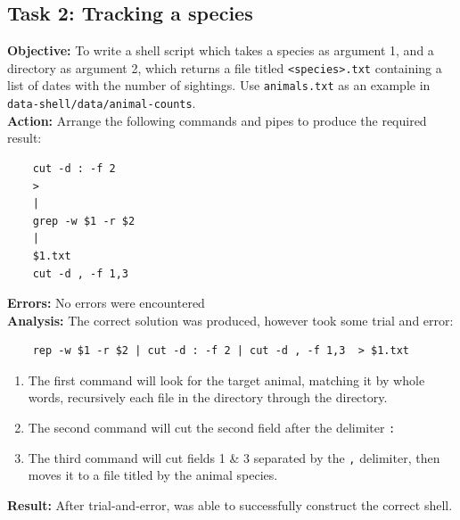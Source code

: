 \documentclass{article}
\begin{document}
\subsection{Task 2: Tracking a species}
%
\textbf{Objective:} To write a shell script which takes a species as argument 1, and a directory as argument 2, which returns a file titled \verb|<species>.txt| containing a list of dates with the number of sightings. Use \verb|animals.txt| as an example in \verb|data-shell/data/animal-counts|.\\
\textbf{Action:} Arrange the following commands and pipes to produce the required result:
\begin{verbatim}
    cut -d : -f 2
    >
    |
    grep -w $1 -r $2
    |
    $1.txt
    cut -d , -f 1,3
\end{verbatim}
\textbf{Errors:} No errors were encountered\\
\textbf{Analysis:} The correct solution was produced, however took some trial and error:
\begin{verbatim}
    rep -w $1 -r $2 | cut -d : -f 2 | cut -d , -f 1,3  > $1.txt
    \end{verbatim}
\begin{enumerate}
    \item The first command will look for the target animal, matching it by whole words, recursively each file in the directory through the directory.
    \item The second command will cut the second field after the delimiter \texttt{:}
    \item The third command will cut fields 1 \& 3 separated by the \texttt{,} delimiter, then moves it to a file titled by the animal species.
\end{enumerate}
\textbf{Result:} After trial-and-error, was able to successfully construct the correct shell.
%
\end{document}
